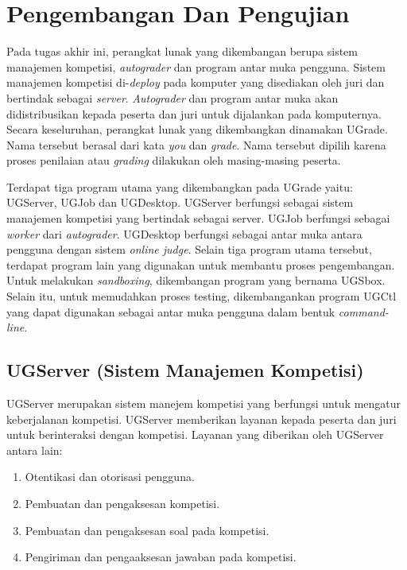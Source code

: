 \chapter{Pengembangan Dan Pengujian}

\par Pada tugas akhir ini, perangkat lunak yang dikembangan berupa sistem manajemen kompetisi, \textit{autograder} dan program antar muka pengguna.  Sistem manajemen kompetisi di-\textit{deploy} pada komputer yang disediakan oleh juri dan bertindak sebagai \textit{server}. \textit{Autograder} dan program antar muka akan didistribusikan kepada peserta dan juri untuk dijalankan pada komputernya. Secara keseluruhan, perangkat lunak yang dikembangkan dinamakan UGrade. Nama tersebut berasal dari kata \textit{you} dan \textit{grade}. Nama tersebut dipilih karena proses penilaian atau \textit{grading} dilakukan oleh masing-masing peserta.

\par Terdapat tiga program utama yang dikembangkan pada UGrade yaitu: UGServer, UGJob dan UGDesktop. UGServer berfungsi sebagai sistem manajemen kompetisi yang bertindak sebagai server. UGJob berfungsi sebagai \textit{worker} dari \textit{autograder}. UGDesktop berfungsi sebagai antar muka antara pengguna dengan sistem \textit{online judge}. Selain tiga program utama tersebut, terdapat program lain yang digunakan untuk membantu proses pengembangan. Untuk melakukan \textit{sandboxing}, dikembangan program yang bernama UGSbox. Selain itu, untuk memudahkan proses testing, dikembangankan program UGCtl yang dapat digunakan sebagai antar muka pengguna dalam bentuk \textit{command-line}.

\section{UGServer (Sistem Manajemen Kompetisi)}

\par UGServer merupakan sistem manejem kompetisi yang berfungsi untuk mengatur keberjalanan kompetisi. UGServer memberikan layanan kepada peserta dan juri untuk berinteraksi dengan kompetisi. Layanan yang diberikan oleh UGServer antara lain:
\begin{enumerate}
  \item Otentikasi dan otorisasi pengguna.
  \item Pembuatan dan pengaksesan kompetisi.
  \item Pembuatan dan pengaksesan soal pada kompetisi.
  \item Pengiriman dan pengaaksesan jawaban pada kompetisi.
\end{enumerate}

